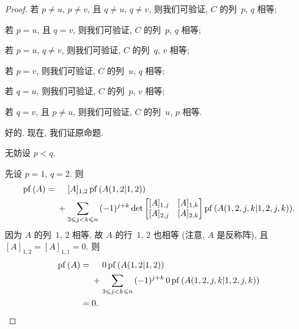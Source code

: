 \begin{proof}
    若 \(p \neq u\), \(p \neq v\),
    且 \(q \neq u\), \(q \neq v\),
    则我们可验证, \(C\) 的列~\(p\), \(q\) 相等;

    若 \(p = u\), 且 \(q = v\),
    则我们可验证, \(C\) 的列~\(p\), \(q\) 相等;

    若 \(p = u\), \(q \neq v\),
    则我们可验证, \(C\) 的列~\(q\), \(v\) 相等;

    若 \(p = v\),
    则我们可验证, \(C\) 的列~\(u\), \(q\) 相等;

    若 \(q = u\),
    则我们可验证, \(C\) 的列~\(p\), \(v\) 相等;

    若 \(q = v\), 且 \(p \neq u\),
    则我们可验证, \(C\) 的列~\(u\), \(p\) 相等.

    \vspace{2ex}

    好的.
    现在, 我们证原命题.

    无妨设 \(p < q\).

    先设 \(p = 1\), \(q = 2\).
    则
    \begin{align*}
        \operatorname{pf} {(A)}
        = {} &
        \hphantom{{} + {}}
        [A]_{1,2}
        \operatorname{pf} {(A({1,2}|{1,2}))}
        \\
             &
        +
        \sum_{3 \leq j < k \leq n}
        {
        (-1)^{j + k}
        \det {
            \begin{bmatrix}
                [A]_{1,j} & [A]_{1,k} \\
                [A]_{2,j} & [A]_{2,k} \\
            \end{bmatrix}
        }
        \operatorname{pf} {(A({1,2,j,k}|{1,2,j,k}))}
        }.
    \end{align*}
    因为 \(A\) 的列~\(1\), \(2\) 相等,
    故 \(A\) 的行~\(1\), \(2\) 也相等
    (注意, \(A\) 是反称阵),
    且 \([A]_{1,2} = [A]_{1,1} = 0\).
    则
    \begin{align*}
        \operatorname{pf} {(A)}
        = {} &
        \hphantom{{} + {}}
        0
        \operatorname{pf} {(A({1,2}|{1,2}))}
        \\
             &
        +
        \sum_{3 \leq j < k \leq n}
        {
        (-1)^{j + k}
        \,
        0
        \operatorname{pf} {(A({1,2,j,k}|{1,2,j,k}))}
        }
        \\
        = {} &
        0.
    \end{align*}


\end{proof}
